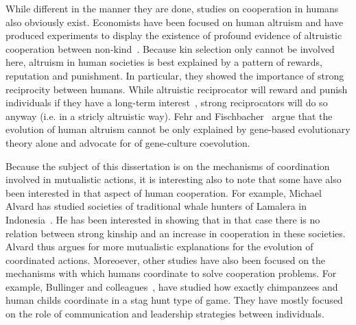     While different in the manner they are done, studies on cooperation in humans also obviously exist. Economists have been focused on human altruism and have produced experiments to display the existence of profound evidence of altruistic cooperation between non-kind~\parencite{Fehr2002, Fehr2003a}. Because kin selection only cannot be involved here, altruism in human societies is best explained by a pattern of rewards, reputation and punishment. In particular, they showed the importance of strong reciprocity between humans. While altruistic reciprocator will reward and punish individuals if they have a long-term interest~\parencite{Trivers1971}, strong reciprocators will do so anyway (i.e. in a stricly altruistic way). Fehr and Fischbacher~\parencite{Fehr2003a} argue that the evolution of human altruism cannot be only explained by gene-based evolutionary theory alone and advocate for of gene-culture coevolution.

    Because the subject of this dissertation is on the mechanisms of coordination involved in mutualistic actions, it is interesting also to note that some have also been interested in that aspect of human cooperation. For example, Michael Alvard has studied societies of traditional whale hunters of Lamalera in Indonesia~\parencite{Alvard1999, Alvard2003}. He has been interested in showing that in that case there is no relation between strong kinship and an increase in cooperation in these societies. Alvard thus argues for more mutualistic explanations for the evolution of coordinated actions. Moreoever, other studies have also been focused on the mechanisms with which humans coordinate to solve cooperation problems. For example, Bullinger and colleagues~\parencite{Bullinger2011, Duguid2014}, have studied how exactly chimpanzees and human childs coordinate in a stag hunt type of game. They have mostly focused on the role of communication and leadership strategies between individuals.

